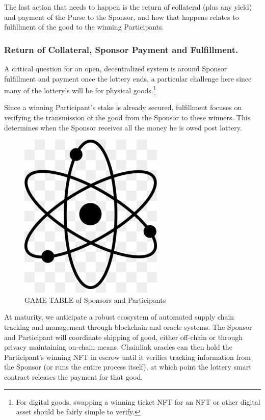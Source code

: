 \documentclass[runningheads]{llncs}
\begin{document}
The last action that needs to happen is the return of collateral (plus any yield) and payment of the Purse to the Sponsor, and how that happens relates to fulfillment of the good to the winning Participants.

\subsubsection{Return of Collateral, Sponsor Payment and Fulfillment.}  A critical question for an open, decentralized system is around Sponsor fulfillment and payment once the lottery ends, a particular challenge here since many of the lottery’s will be for physical goods.\footnote{For digital goods, swapping a winning ticket NFT for an NFT or other digital asset should be fairly simple to verify.}

Since a winning Participant’s stake is already secured, fulfillment focuses on verifying the transmission of the good from the Sponsor to these winners.  This determines when the Sponsor receives all the money he is owed post lottery.


\begin{figure}[H]
\centering
\includegraphics[scale=0.5]{Figures_and_Tables/atom.png}
\caption{GAME TABLE of Sponsors and Participants}
\end{figure}

At maturity, we anticipate a robust ecosystem of automated supply chain tracking and management through blockchain and oracle systems.  The Sponsor and Participant will coordinate shipping of good, either off-chain or through privacy maintaining on-chain means.  Chainlink oracles can then hold the Participant’s winning NFT in escrow until it verifies tracking information from the Sponsor (or runs the entire process itself), at which point the lottery smart contract releases the payment for that good.
\end{document}
